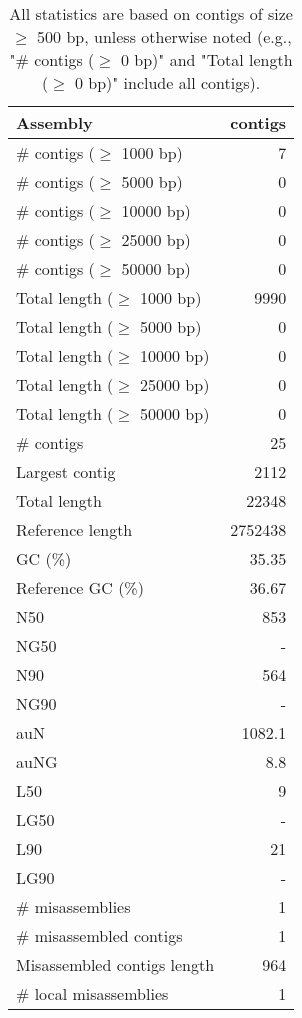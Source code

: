 \documentclass[12pt,a4paper]{article}
\begin{document}
\begin{table}[ht]
\begin{center}
\caption{All statistics are based on contigs of size $\geq$ 500 bp, unless otherwise noted (e.g., "\# contigs ($\geq$ 0 bp)" and "Total length ($\geq$ 0 bp)" include all contigs).}
\begin{tabular}{|l*{1}{|r}|}
\hline
Assembly & contigs \\ \hline
\# contigs ($\geq$ 1000 bp) & 7 \\ \hline
\# contigs ($\geq$ 5000 bp) & 0 \\ \hline
\# contigs ($\geq$ 10000 bp) & 0 \\ \hline
\# contigs ($\geq$ 25000 bp) & 0 \\ \hline
\# contigs ($\geq$ 50000 bp) & 0 \\ \hline
Total length ($\geq$ 1000 bp) & 9990 \\ \hline
Total length ($\geq$ 5000 bp) & 0 \\ \hline
Total length ($\geq$ 10000 bp) & 0 \\ \hline
Total length ($\geq$ 25000 bp) & 0 \\ \hline
Total length ($\geq$ 50000 bp) & 0 \\ \hline
\# contigs & 25 \\ \hline
Largest contig & 2112 \\ \hline
Total length & 22348 \\ \hline
Reference length & 2752438 \\ \hline
GC (\%) & 35.35 \\ \hline
Reference GC (\%) & 36.67 \\ \hline
N50 & 853 \\ \hline
NG50 & - \\ \hline
N90 & 564 \\ \hline
NG90 & - \\ \hline
auN & 1082.1 \\ \hline
auNG & 8.8 \\ \hline
L50 & 9 \\ \hline
LG50 & - \\ \hline
L90 & 21 \\ \hline
LG90 & - \\ \hline
\# misassemblies & 1 \\ \hline
\# misassembled contigs & 1 \\ \hline
Misassembled contigs length & 964 \\ \hline
\# local misassemblies & 1 \\ \hline

\end{tabular}
\end{center}
\end{table}
\end{document}

